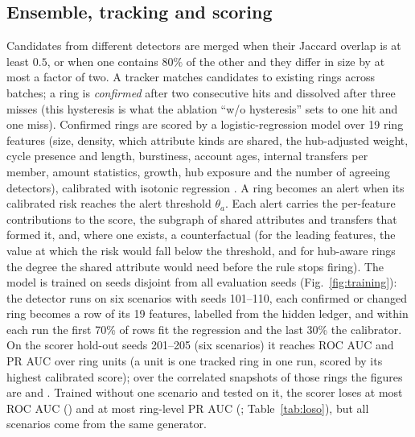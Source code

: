 \subsection{Ensemble, tracking and scoring}
Candidates from different detectors are merged when their Jaccard overlap is at
least $0.5$, or when one contains $80\%$ of the other and they differ in size by
at most a factor of two. A tracker matches candidates to existing rings across
batches; a ring is \emph{confirmed} after two consecutive hits and dissolved
after three misses (this hysteresis is what the ablation ``w/o hysteresis''
sets to one hit and one miss). Confirmed rings are scored by a logistic-regression model
over 19 ring features (size, density, which attribute kinds are shared, the
hub-adjusted weight, cycle presence and length, burstiness, account ages,
internal transfers per member, amount statistics, growth, hub exposure and
the number of agreeing detectors), calibrated with isotonic regression
\cite{zadrozny2002transforming}. A ring becomes an alert when its calibrated risk
reaches the alert threshold $\theta_a$. Each alert carries the per-feature
contributions to the score, the subgraph of shared attributes and transfers
that formed it, and, where one exists, a counterfactual (for the leading
features, the value at which the risk would fall below the threshold, and for
hub-aware rings the degree the shared attribute would need before the rule
stops firing). The model is trained on
seeds disjoint from all evaluation seeds (Fig.~\ref{fig:training}): the detector
runs on six scenarios with seeds 101--110, each confirmed or changed ring
becomes a row of its 19 features, labelled from the hidden ledger, and within
each run the first 70\% of rows fit the regression and the last 30\% the
calibrator. On the scorer hold-out seeds 201--205 (six scenarios) it reaches
ROC AUC \GenRingAUC{} and PR AUC \GenRingPR{} over \GenRingUnits{} ring units
(a unit is one tracked ring in one run, scored by its highest calibrated
score); over the \GenSnapUnits{} correlated snapshots of those rings the
figures are \GenSnapAUC{} and \GenSnapPR{}.
Trained without one scenario and tested on it, the scorer loses at most
\GenDropSnapAUC{} ROC AUC (\texttt{\GenDropSnapAUCWhere}) and at most
\GenDropRingPR{} ring-level PR AUC (\texttt{\GenDropRingPRWhere};
Table~\ref{tab:loso}), but all scenarios come from the same generator.



